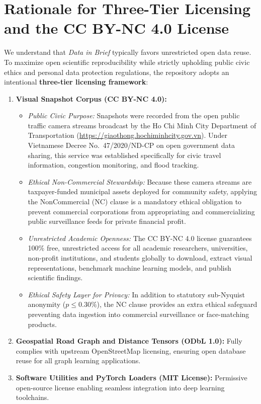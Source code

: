 \documentclass[10.5pt,a4paper]{article}
\begin{document}
\section*{Rationale for Three-Tier Licensing and the CC BY-NC 4.0 License}
We understand that \textit{Data in Brief} typically favors unrestricted open data reuse. To maximize open scientific reproducibility while strictly upholding public civic ethics and personal data protection regulations, the repository adopts an intentional \textbf{three-tier licensing framework}:
\begin{enumerate}[leftmargin=*,noitemsep,topsep=2pt]
    \item \textbf{Visual Snapshot Corpus (CC BY-NC 4.0):}
    \begin{itemize}[noitemsep,topsep=1pt]
        \item \textit{Public Civic Purpose:} Snapshots were recorded from the open public traffic camera streams broadcast by the Ho Chi Minh City Department of Transportation (\url{https://giaothong.hochiminhcity.gov.vn}). Under Vietnamese Decree No.~47/2020/ND-CP on open government data sharing, this service was established specifically for civic travel information, congestion monitoring, and flood tracking.
        \item \textit{Ethical Non-Commercial Stewardship:} Because these camera streams are taxpayer-funded municipal assets deployed for community safety, applying the NonCommercial (NC) clause is a mandatory ethical obligation to prevent commercial corporations from appropriating and commercializing public surveillance feeds for private financial profit.
        \item \textit{Unrestricted Academic Openness:} The CC BY-NC 4.0 license guarantees 100\% free, unrestricted access for all academic researchers, universities, non-profit institutions, and students globally to download, extract visual representations, benchmark machine learning models, and publish scientific findings.
        \item \textit{Ethical Safety Layer for Privacy:} In addition to statutory sub-Nyquist anonymity ($p \le 0.30\%$), the NC clause provides an extra ethical safeguard preventing data ingestion into commercial surveillance or face-matching products.
    \end{itemize}
    \item \textbf{Geospatial Road Graph and Distance Tensors (ODbL 1.0):} Fully complies with upstream OpenStreetMap licensing, ensuring open database reuse for all graph learning applications.
    \item \textbf{Software Utilities and PyTorch Loaders (MIT License):} Permissive open-source license enabling seamless integration into deep learning toolchains.
\end{enumerate}
\end{document}
